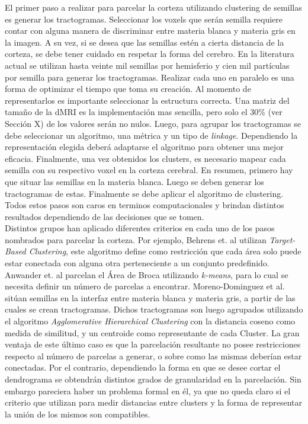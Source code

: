 El primer paso a realizar para parcelar la corteza utilizando clustering
de semillas es generar los tractogramas. 
Seleccionar los voxels que ser\'an semilla requiere contar con alguna manera de
discriminar entre materia blanca y materia gris en la imagen. A su vez, si se
desea que las semillas est\'en a cierta distancia de la corteza, se debe tener
cuidado en respetar la forma del cerebro. En la literatura actual se
utilizan hasta veinte mil semillas por hemisferio \cite{Moreno-Dominguez2014} y
cien mil part\'iculas por semilla \cite{Anwander2006} para generar los tractogramas.
Realizar cada uno en paralelo es una forma de optimizar el tiempo que toma
su creaci\'on. Al momento de representarlos es importante seleccionar la estructura
correcta. Una matriz del tama\~no de la dMRI es la implementaci\'on mas sencilla, 
pero solo el 30\% (ver Secci\'on X) de los valores ser\'an no nulos. Luego, para
agrupar los tractogramas se debe seleccionar un algoritmo, una m\'etrica y 
un tipo de \textit{linkage}. Dependiendo la representaci\'on elegida deber\'a
adaptarse el algoritmo para obtener una mejor eficacia. Finalmente, una vez
obtenidos los clusters, es necesario mapear cada semilla con su respectivo voxel
en la corteza cerebral. En resumen, primero hay que situar las semillas en la
materia blanca. Luego se deben generar los tractogramas de estas. Finalmente se
debe aplicar el algoritmo de clustering. Todos estos pasos son caros en terminos
computacionales y brindan distintos resultados dependiendo de las decisiones que
se tomen. \\

Distintos grupos han aplicado diferentes criterios en cada uno de los pasos
nombrados para parcelar la corteza. Por ejemplo, Behrens et. al \cite{Behrens2003}
utilizan \textit{Target-Based Clustering}, este algoritmo define como
restricci\'on que cada \'area solo puede estar conectada con alguna otra
perteneciente a un conjunto predefinido. Anwander et. al \cite{Anwander2006} 
parcelan el \'Area de Broca utilizando \textit{k-means}, para lo cual se necesita
definir un n\'umero de parcelas a encontrar. Moreno-Dominguez et al. 
\cite{Moreno-Dominguez2014} sit\'uan semillas en la interfaz entre materia blanca
y materia gris, a partir de las cuales se crean tractogramas. Dichos tractogramas
son luego agrupados utilizando el algoritmo \textit{Agglomerative Hierarchical
Clustering} con la distancia coseno como medida de similitud, y un centroide como
representante de cada Cluster. La gran ventaja de este \'ultimo caso es que la
parcelaci\'on resultante no posee restricciones respecto al n\'umero de parcelas
a generar, o sobre como las mismas deber\'ian estar conectadas. Por el contrario,
dependiendo la forma en que se desee cortar el dendrograma se obtendr\'an
distintos grados de granularidad en la parcelaci\'on. Sin embargo pareciera haber
un problema formal en \'el, ya que no queda claro si el criterio que utilizan para
medir distancias entre clusters y la forma de representar la uni\'on de los mismos
son compatibles.  \\

